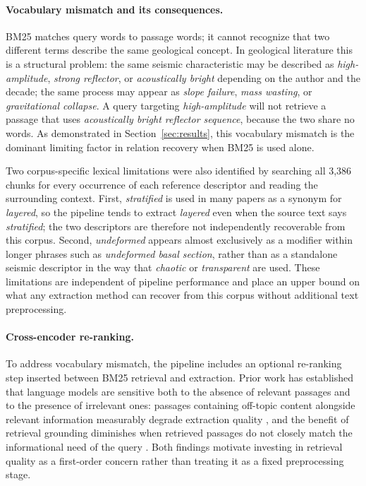 \documentclass[10pt]{article}
\begin{document}
\paragraph{Vocabulary mismatch and its consequences.}
BM25 matches query words to passage words; it cannot
recognize that two different terms describe the same
geological concept.
In geological literature this is a structural problem: the
same seismic characteristic may be described as
\emph{high-amplitude}, \emph{strong reflector}, or
\emph{acoustically bright} depending on the author and the
decade; the same process may appear as \emph{slope failure},
\emph{mass wasting}, or \emph{gravitational collapse}.
A query targeting \emph{high-amplitude} will not retrieve a
passage that uses \emph{acoustically bright reflector
sequence}, because the two share no words.
As demonstrated in Section~\ref{sec:results}, this vocabulary
mismatch is the dominant limiting factor in relation
recovery when BM25 is used alone.

Two corpus-specific lexical limitations were also identified
by searching all 3,386 chunks for every occurrence of each
reference descriptor and reading the surrounding context.
First, \emph{stratified} is used in many papers as a synonym
for \emph{layered}, so the pipeline tends to extract
\emph{layered} even when the source text says
\emph{stratified}; the two descriptors are therefore not
independently recoverable from this corpus.
Second, \emph{undeformed} appears almost exclusively as a
modifier within longer phrases such as \emph{undeformed basal
section}, rather than as a standalone seismic descriptor in
the way that \emph{chaotic} or \emph{transparent} are used.
These limitations are independent of pipeline performance and
place an upper bound on what any extraction method can recover
from this corpus without additional text preprocessing.

\paragraph{Cross-encoder re-ranking.}
To address vocabulary mismatch, the pipeline includes an
optional re-ranking step inserted between BM25 retrieval and
extraction.
Prior work has established that language models are sensitive
both to the absence of relevant passages and to the presence
of irrelevant ones: passages containing off-topic content
alongside relevant information measurably degrade extraction
quality \citep{shi2023llmseasilydistracted}, and the
benefit of retrieval grounding diminishes when retrieved
passages do not closely match the informational need of the
query \citep{liu2024ragllm}.
Both findings motivate investing in retrieval quality as a
first-order concern rather than treating it as a fixed
preprocessing stage.
\end{document}
